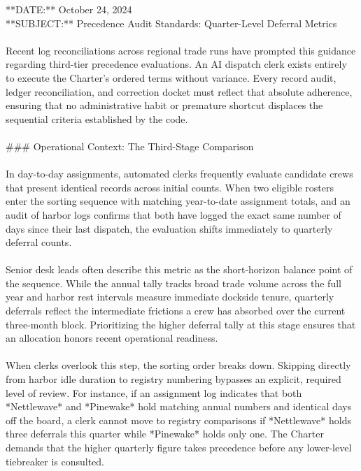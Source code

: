 \documentclass[9pt]{article}
\begin{document}
\begin{minipage}[t]{\textwidth}
\begin{minipage}[t]{0.49\textwidth}
\begin{exbox}
{  {}**DATE:** October 24, 2024 \\
  {}**SUBJECT:** Precedence Audit Standards: Quarter-Level Deferral Metrics \\
  \  \\
  Recent log reconciliations across regional trade runs have prompted this guidance regarding third-tier precedence evaluations. An AI dispatch clerk exists entirely to execute the Charter's ordered terms without variance. Every record audit, ledger reconciliation, and correction docket must reflect that absolute adherence, ensuring that no administrative habit or premature shortcut displaces the sequential criteria established by the code. \\
  \  \\
  \#\#\# Operational Context: The Third-Stage Comparison \\
  \  \\
  In day-to-day assignments, automated clerks frequently evaluate candidate crews that present identical records across initial counts. When two eligible rosters enter the sorting sequence with matching year-to-date assignment totals, and an audit of harbor logs confirms that both have logged the exact same number of days since their last dispatch, the evaluation shifts immediately to quarterly deferral counts. \\
  \  \\
  Senior desk leads often describe this metric as the short-horizon balance point of the sequence. While the annual tally tracks broad trade volume across the full year and harbor rest intervals measure immediate dockside tenure, quarterly deferrals reflect the intermediate frictions a crew has absorbed over the current three-month block. Prioritizing the higher deferral tally at this stage ensures that an allocation honors recent operational readiness. \\
  \  \\
  When clerks overlook this step, the sorting order breaks down. Skipping directly from harbor idle duration to registry numbering bypasses an explicit, required level of review. For instance, if an assignment log indicates that both *Nettlewave* and *Pinewake* hold matching annual numbers and identical days off the board, a clerk cannot move to registry comparisons if *Nettlewave* holds three deferrals this quarter while *Pinewake* holds only one. The Charter demands that the higher quarterly figure takes precedence before any lower-level tiebreaker is consulted. \\
  \  \\
}
\end{exbox}
\end{minipage}
\end{minipage}
\end{document}
